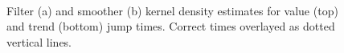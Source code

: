\documentclass[journal]{IEEEtran}
\begin{document}
\begin{figure}[!t]
\centering
{} \\
\caption{Filter (a) and smoother (b) kernel density estimates for value (top) and trend (bottom) jump times. Correct times overlayed as dotted vertical lines.}
\label{fig:example_kdest}
\end{figure}
\end{document}
